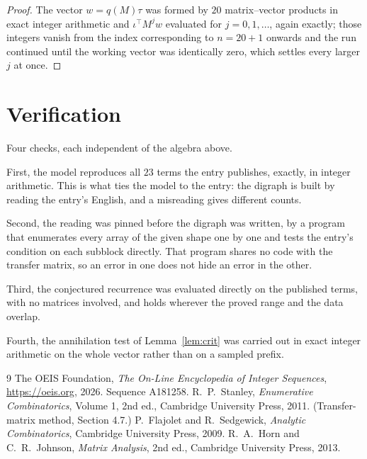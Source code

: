 \documentclass[11pt,a4paper]{article}
\theoremstyle{plain}
\theoremstyle{definition}
\begin{document}
\begin{proof}
The vector $w=q(M)\tau$ was formed by $20$ matrix--vector products in exact integer
arithmetic and $\iota^{\!\top}M^{j}w$ evaluated for $j=0,1,\dots$, again exactly; those
integers vanish from the index corresponding to $n=20+1$ onwards and the run continued
until the working vector was identically zero, which settles every larger $j$ at once.
\end{proof}

\section{Verification}

Four checks, each independent of the algebra above.

First, the model reproduces all $23$ terms the entry publishes, exactly, in integer
arithmetic. This is what ties the model to the entry: the digraph is built by reading the
entry's English, and a misreading gives different counts.

Second, the reading was pinned before the digraph was written, by a program that enumerates
every array of the given shape one by one and tests the entry's condition on each subblock
directly. That program shares no code with the transfer matrix, so an error in one does not
hide an error in the other.

Third, the conjectured recurrence was evaluated directly on the published terms, with no
matrices involved, and holds wherever the proved range and the data overlap.

Fourth, the annihilation test of Lemma~\ref{lem:crit} was carried out in exact integer
arithmetic on the whole vector rather than on a sampled prefix.

\begin{thebibliography}{9}
 The OEIS Foundation, \emph{The On-Line Encyclopedia of Integer
Sequences}, \url{https://oeis.org}, 2026. Sequence A181258.
 R.~P.~Stanley, \emph{Enumerative Combinatorics}, Volume 1, 2nd ed.,
Cambridge University Press, 2011. (Transfer-matrix method, Section 4.7.)
 P.~Flajolet and R.~Sedgewick, \emph{Analytic Combinatorics}, Cambridge
University Press, 2009.
 R.~A.~Horn and C.~R.~Johnson, \emph{Matrix Analysis}, 2nd ed., Cambridge
University Press, 2013.
\end{thebibliography}
\end{document}
